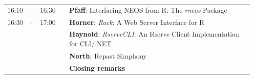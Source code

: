 \documentclass[10pt]{article}
\begin{document}
\begin{tabular}{rlrlp{5in}}
   16:10 & -- & 16:30  &   & \textbf{\color{Talk} Pfaff}: \small{Interfacing NEOS from R: The \emph{rneos} Package} \\
   16:30 & -- & 17:00  &   & \textbf{\color{LightningTalk} Horner}: \small{\emph{Rack}: A Web Server Interface for R} \\
          &    &        &    & \textbf{\color{LightningTalk} Haynold}: \small{\emph{RserveCLI}: An Rserve Client Implementation for CLI/.NET} \\
          &    &         &   & \textbf{\color{LightningTalk} North}: \small{Repast Simphony} \\
          &    &         &   & \textbf{\color{Breaks} Closing remarks} \\
\end{tabular}
\end{document}
